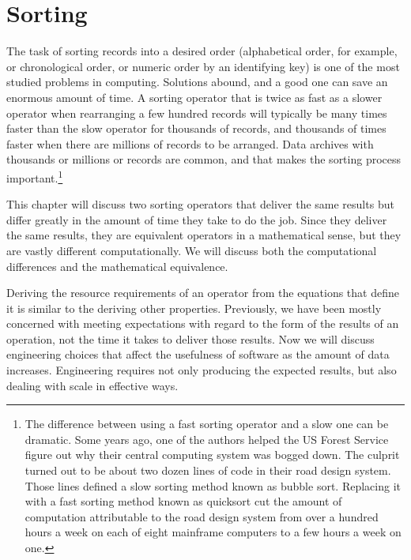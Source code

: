 \chapter{Sorting}
\label{ch:sorting}

The task of sorting records into a desired order
(alphabetical order, for example, or chronological order,
or numeric order by an identifying key)
is one of the most studied problems in computing.
Solutions abound,
and a good one can save an enormous amount of time.
A sorting operator that is twice as fast
as a slower operator when rearranging a few hundred records
will typically be many times faster than the slow operator
for thousands of records, and thousands of times faster
when there are millions of records to be arranged.
Data archives with thousands or millions or records
are common, and that makes the sorting process important.\footnote{The
difference between using a fast sorting operator and a slow one
can be dramatic.
\label{bubble-vs-quicksort-example}
Some years ago, one of the authors helped the US Forest Service
figure out why their central computing system
was bogged down.
The culprit turned out to be about two dozen lines
of code in their road design system.
Those lines defined a slow sorting method
known as bubble sort. Replacing it with a fast sorting
method known as quicksort cut the amount of computation
attributable to the road design system from over a hundred
hours a week on each of eight mainframe computers to a few hours
a week on one.}

This chapter will discuss two sorting operators that
deliver the same results but differ
greatly in the amount of time they take to do the job.
Since they deliver the same results,
they are equivalent operators in a mathematical sense,
but they are vastly different computationally.
We will discuss both the computational differences
and the 
mathematical equivalence.

Deriving the resource requirements of an operator from
the equations that define it is
similar to the deriving other properties.
Previously, we have been mostly concerned with meeting
expectations with regard to the form of the results
of an operation, not the time it takes to deliver those results.
Now we will discuss engineering choices that affect the usefulness of
software as the amount of data increases.
Engineering requires not only producing the expected
results, but also dealing with scale in effective ways.

